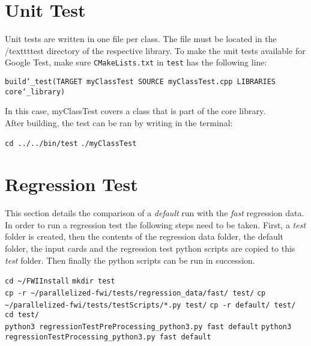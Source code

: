 \documentclass[10pt]{article}
\begin{document}
\section{Unit Test}

Unit tests are written in one file per class. The file must be located in the /texttt{test} directory of the respective library. To make the unit tests available for Google Test, make sure \texttt{CMakeLists.txt} in \texttt{test} has the following line:
\newline

\texttt{build\char`_test(TARGET myClassTest SOURCE myClassTest.cpp LIBRARIES core\char`_library)}
\newline

In this case, myClassTest covers a class that is part of the core library.\\
After building, the test can be ran by writing in the terminal:\\
\newline

\texttt{cd ../../bin/test}
\newline
\texttt{./myClassTest}
\newline

\section{Regression Test}
This section details the comparison of a \textit{default} run with the \textit{fast} regression data. In order to run a regression test the following steps need to be taken. First, a \textit{test} folder is created, then the contents of the regression data folder, the default folder, the input cards and the regression test python scripts are copied to this \textit{test} folder. Then finally the python scripts can be run in succession.  
\newline

\texttt{cd \textasciitilde/FWIInstall}
\newline
\texttt{mkdir test}
\\
\texttt{cp -r \textasciitilde/parallelized-fwi/tests/regression\_data/fast/ test/}
\newline
\texttt{cp \textasciitilde/parallelized-fwi/tests/testScripts/*.py test/}
\newline
\texttt{cp -r default/ test/}
\\
\texttt{cd test/}
\\
\texttt{python3 regressionTestPreProcessing\_python3.py fast default}
\newline
\texttt{python3 regressionTestProcessing\_python3.py fast default}
\end{document}

